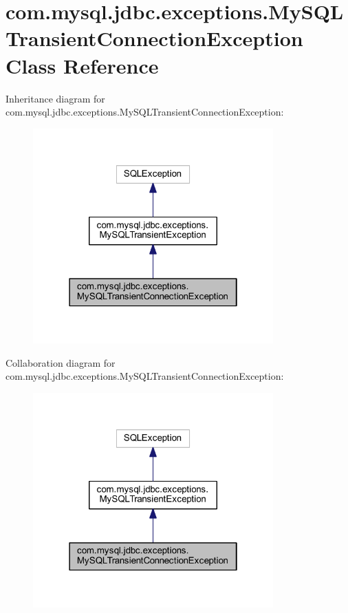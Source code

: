 \hypertarget{classcom_1_1mysql_1_1jdbc_1_1exceptions_1_1_my_s_q_l_transient_connection_exception}{}\section{com.\+mysql.\+jdbc.\+exceptions.\+My\+S\+Q\+L\+Transient\+Connection\+Exception Class Reference}
\label{classcom_1_1mysql_1_1jdbc_1_1exceptions_1_1_my_s_q_l_transient_connection_exception}


Inheritance diagram for com.\+mysql.\+jdbc.\+exceptions.\+My\+S\+Q\+L\+Transient\+Connection\+Exception\+:
\nopagebreak
\begin{figure}[H]
\begin{center}
\leavevmode
\includegraphics[width=262pt]{classcom_1_1mysql_1_1jdbc_1_1exceptions_1_1_my_s_q_l_transient_connection_exception__inherit__graph}
\end{center}
\end{figure}


Collaboration diagram for com.\+mysql.\+jdbc.\+exceptions.\+My\+S\+Q\+L\+Transient\+Connection\+Exception\+:
\nopagebreak
\begin{figure}[H]
\begin{center}
\leavevmode
\includegraphics[width=262pt]{classcom_1_1mysql_1_1jdbc_1_1exceptions_1_1_my_s_q_l_transient_connection_exception__coll__graph}
\end{center}
\end{figure}
